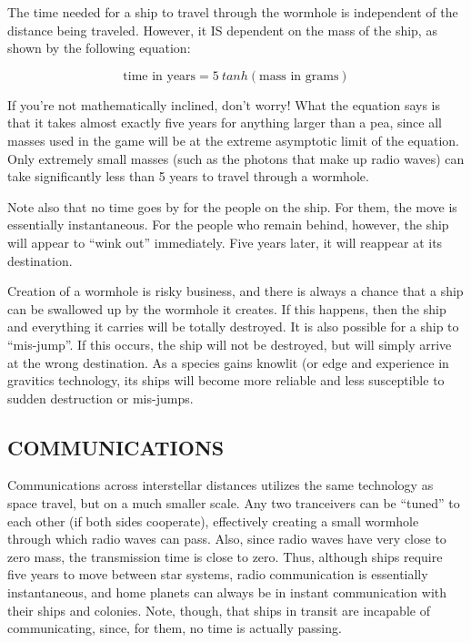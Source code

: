 \documentclass[10pt,titlepage]{article}
\begin{document}
The time needed for a ship to travel through the wormhole is independent of the
distance being traveled.  However, it IS dependent on the mass of the ship, as
shown by the following equation:

\[
\textrm{time in years} = 5\: tanh (\textrm{mass in grams})
\]


If you're not mathematically inclined, don't worry!  What the equation says is
that it takes almost exactly five years for anything larger than a pea, since
all masses used in the game will be at the extreme asymptotic limit of the
equation.  Only extremely small masses (such as the photons that make up radio
waves) can take significantly less than 5 years to travel through a wormhole.

Note also that no time goes by for the people on the ship.  For them, the move
is essentially instantaneous.  For the people who remain behind, however, the
ship will appear to ``wink out'' immediately.  Five years later, it will reappear
at its destination.

Creation of a wormhole is risky business, and there is always a chance that a
ship can be swallowed up by the wormhole it creates.  If this happens, then the
ship and everything it carries will be totally destroyed.  It is also possible
for a ship to ``mis-jump''.  If this occurs, the ship will not be destroyed, but
will simply arrive at the wrong destination.  As a species gains knowlit (or edge and
experience in gravitics technology, its ships will become more reliable and
less susceptible to sudden destruction or mis-jumps.


\subsection{COMMUNICATIONS}

Communications across interstellar distances utilizes the same technology as
space travel, but on a much smaller scale.  Any two tranceivers can be ``tuned''
to each other (if both sides cooperate), effectively creating a small wormhole
through which radio waves can pass.  Also, since radio waves have very close
to zero mass, the transmission time is close to zero.  Thus, although ships
require five years to move between star systems, radio communication is
essentially instantaneous, and home planets can always be in instant
communication with their ships and colonies.  Note, though, that ships in
transit are incapable of communicating, since, for them, no time is actually
passing.
\end{document}
